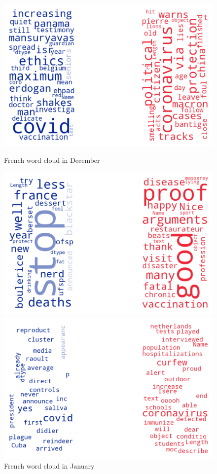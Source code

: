 \begin{landscape}
\begin{figure}[!htb]
  \includegraphics[width=\linewidth]{December fr word cloud.png}
  \caption{French word cloud in December}\label{fig:decemberfr}
\endminipage\hfill
{}
  \includegraphics[width=\linewidth]{January fr word cloud.png}
  \caption{French word cloud in January}\label{fig:januaryfr}
\endminipage\hfill
{}
  \includegraphics[width=\linewidth]{February fr word cloud.png}

\end{figure}
\end{landscape}
